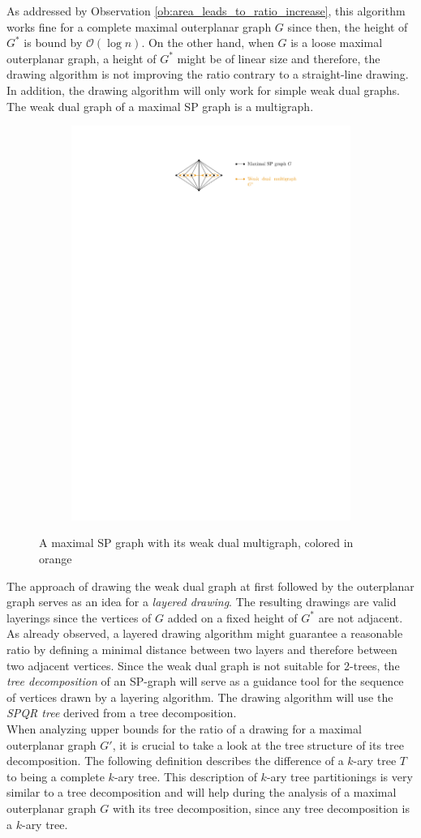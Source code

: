 As addressed by Observation \ref{ob:area_leads_to_ratio_increase}, this algorithm works fine for a complete maximal outerplanar graph $G$ since then, the height of $G^*$ is bound by $\mathcal{O}(\log n)$. On the other hand, when $G$ is a loose maximal outerplanar graph, a height of $G^*$ might be of linear size and therefore, the drawing algorithm is not improving the ratio contrary to a straight-line drawing. In addition, the drawing algorithm will only work for simple weak dual graphs. The weak dual graph of a maximal SP graph is a multigraph.
	\begin{figure}[H]
	\centering
	\begin{subfigure}{\textwidth}
		\centering
		\includegraphics[page=1,width=0.6\linewidth]{graphics/maximal_sp_weak_dual.pdf}
	\end{subfigure}
	\caption{A maximal SP graph with its weak dual multigraph, colored in orange}
\end{figure}
The approach of drawing the weak dual graph at first followed by the outerplanar graph serves as an idea for a \emph{layered drawing}. The resulting drawings are valid layerings since the vertices of $G$ added on a fixed height of $G^*$ are not adjacent. As already observed, a layered drawing algorithm might guarantee a reasonable ratio by defining a minimal distance between two layers and therefore between two adjacent vertices. Since the weak dual graph is not suitable for 2-trees, the \emph{tree decomposition} of an SP-graph will serve as a guidance tool for the sequence of vertices drawn by a layering algorithm. The drawing algorithm will use the \emph{SPQR tree} derived from a tree decomposition.\\
When analyzing upper bounds for the ratio of a drawing for a maximal outerplanar graph $G'$, it is crucial to take a look at the tree structure of its tree decomposition. The following definition describes the difference of a $k$-ary tree $T$ to being a complete $k$-ary tree. This description of $k$-ary tree partitionings is very similar to a tree decomposition and will help during the analysis of a maximal outerplanar graph $G$ with its tree decomposition, since any tree decomposition is a $k$-ary tree.
